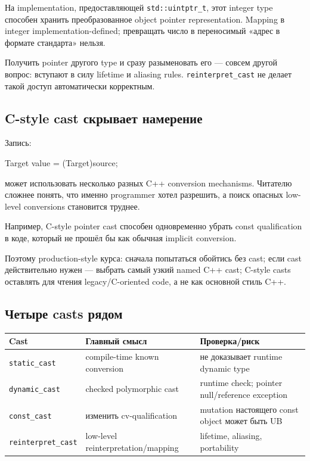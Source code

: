 На implementation, предоставляющей \texttt{std::uintptr\_t}, этот integer type
способен хранить преобразованное object pointer representation. Mapping в
integer implementation-defined; превращать число в переносимый «адрес в
формате стандарта» нельзя.

\begin{warningbox}
Получить pointer другого type и сразу разыменовать его --- совсем другой вопрос:
вступают в силу lifetime и aliasing rules. \texttt{reinterpret\_cast} не делает
такой доступ автоматически корректным.
\end{warningbox}

\subsection{C-style cast скрывает намерение}

Запись:

\begin{cppcode}
Target value = (Target)source;
\end{cppcode}

может использовать несколько разных C++ conversion mechanisms. Читателю
сложнее понять, что именно programmer хотел разрешить, а поиск опасных
low-level conversions становится труднее.

Например, C-style pointer cast способен одновременно убрать const qualification
в коде, который не прошёл бы как обычная implicit conversion.

Поэтому production-style курса:
сначала попытаться обойтись без cast; если cast действительно нужен --- выбрать самый узкий named C++ cast; C-style casts оставлять для чтения legacy/C-oriented code, а не как основной стиль C++.

\subsection{Четыре casts рядом}

\begin{center}
\begin{tabularx}{\textwidth}{L{0.22\textwidth}YY}
\toprule
Cast & Главный смысл & Проверка/риск \\
\midrule
\texttt{static\_cast} & compile-time known conversion & не доказывает runtime dynamic type \\
\texttt{dynamic\_cast} & checked polymorphic cast & runtime check; pointer null/reference exception \\
\texttt{const\_cast} & изменить cv-qualification & mutation настоящего const object может быть UB \\
\texttt{reinterpret\_cast} & low-level reinterpretation/mapping & lifetime, aliasing, portability \\
\bottomrule
\end{tabularx}
\end{center}

